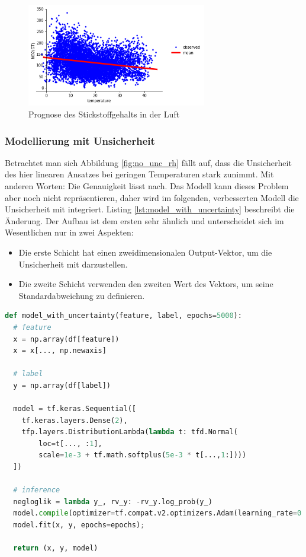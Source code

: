 \documentclass[12pt]{article}
\begin{document}
\begin{figure}[h]
    \centering
    \includegraphics[width=0.7\textwidth]{./figs/no_unc_no2.png}
    \caption{Prognose des Stickstoffgehalts in der Luft}
    \label{fig:no_unc_no2}
\end{figure}


\subsubsection{Modellierung mit Unsicherheit}
\label{sec:with_unc}

Betrachtet man sich Abbildung \ref{fig:no_unc_rh} fällt auf, dass die Unsicherheit des hier linearen Ansatzes bei geringen Temperaturen stark zunimmt. Mit anderen Worten: Die Genauigkeit lässt nach. Das Modell kann dieses Problem aber noch nicht repräsentieren, daher wird im folgenden, verbesserten Modell die Unsicherheit mit integriert. Listing \ref{lst:model_with_uncertainty} beschreibt die Änderung. Der Aufbau ist dem ersten sehr ähnlich und unterscheidet sich im Wesentlichen nur in zwei Aspekten: 

\begin{itemize}
  \item Die erste Schicht hat einen zweidimensionalen Output-Vektor, um die Unsicherheit mit darzustellen.
  \item Die zweite Schicht verwenden den zweiten Wert des Vektors, um seine Standardabweichung zu definieren. 
\end{itemize}



\begin{lstlisting}[language=Python, caption={Modell mit Keras mit Unsicherheit}, label={lst:model_with_uncertainty}]
def model_with_uncertainty(feature, label, epochs=5000):
  # feature
  x = np.array(df[feature])
  x = x[..., np.newaxis]

  # label
  y = np.array(df[label])
  
  model = tf.keras.Sequential([
    tf.keras.layers.Dense(2),
    tfp.layers.DistributionLambda(lambda t: tfd.Normal(
        loc=t[..., :1],
        scale=1e-3 + tf.math.softplus(5e-3 * t[...,1:])))
  ])

  # inference
  negloglik = lambda y_, rv_y: -rv_y.log_prob(y_)
  model.compile(optimizer=tf.compat.v2.optimizers.Adam(learning_rate=0.01), loss=negloglik)
  model.fit(x, y, epochs=epochs);

  return (x, y, model)
\end{lstlisting}
\end{document}
